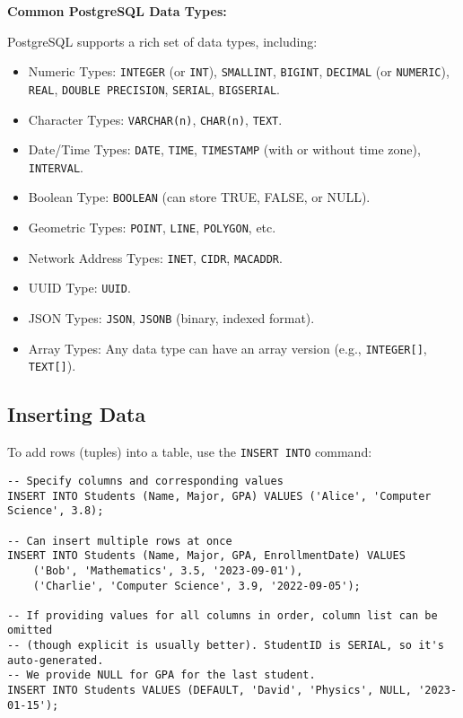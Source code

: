 \documentclass[12pt]{book}
\begin{document}
\textbf{Common PostgreSQL Data Types:}

PostgreSQL supports a rich set of data types, including:

\begin{itemize}
    \item Numeric Types: \texttt{INTEGER} (or \texttt{INT}), \texttt{SMALLINT}, \texttt{BIGINT}, \texttt{DECIMAL} (or \texttt{NUMERIC}), \texttt{REAL}, \texttt{DOUBLE PRECISION}, \texttt{SERIAL}, \texttt{BIGSERIAL}.
    \item Character Types: \texttt{VARCHAR(n)}, \texttt{CHAR(n)}, \texttt{TEXT}.
    \item Date/Time Types: \texttt{DATE}, \texttt{TIME}, \texttt{TIMESTAMP} (with or without time zone), \texttt{INTERVAL}.
    \item Boolean Type: \texttt{BOOLEAN} (can store TRUE, FALSE, or NULL).
    \item Geometric Types: \texttt{POINT}, \texttt{LINE}, \texttt{POLYGON}, etc.
    \item Network Address Types: \texttt{INET}, \texttt{CIDR}, \texttt{MACADDR}.
    \item UUID Type: \texttt{UUID}.
    \item JSON Types: \texttt{JSON}, \texttt{JSONB} (binary, indexed format).
    \item Array Types: Any data type can have an array version (e.g., \texttt{INTEGER[]}, \texttt{TEXT[]}).
\end{itemize}

\subsection{Inserting Data}

To add rows (tuples) into a table, use the \texttt{INSERT INTO} command:

\begin{lstlisting}[caption={Inserting data into Students}, label=lst:insert_students]
-- Specify columns and corresponding values
INSERT INTO Students (Name, Major, GPA) VALUES ('Alice', 'Computer Science', 3.8);

-- Can insert multiple rows at once
INSERT INTO Students (Name, Major, GPA, EnrollmentDate) VALUES
    ('Bob', 'Mathematics', 3.5, '2023-09-01'),
    ('Charlie', 'Computer Science', 3.9, '2022-09-05');

-- If providing values for all columns in order, column list can be omitted
-- (though explicit is usually better). StudentID is SERIAL, so it's auto-generated.
-- We provide NULL for GPA for the last student.
INSERT INTO Students VALUES (DEFAULT, 'David', 'Physics', NULL, '2023-01-15');
\end{lstlisting}
\end{document}
